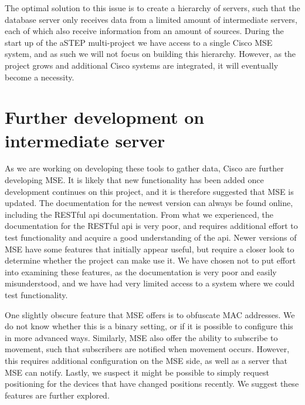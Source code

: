 The optimal solution to this issue is to create a hierarchy of servers, such that the database server only receives data from a limited amount of intermediate servers, each of which also receive information from an amount of sources. During the start up of the aSTEP multi-project we have access to a single Cisco MSE system, and as such we will not focus on building this hierarchy. However, as the project grows and additional Cisco systems are integrated, it will eventually become a necessity.

\section{Further development on intermediate server}\label{sec:future_intermediate}
As we are working on developing these tools to gather data, Cisco are further developing MSE. It is likely that new functionality has been added once development continues on this project, and it is therefore suggested that MSE is updated. The documentation for the newest version can always be found online, including the RESTful api documentation. From what we experienced, the documentation for the RESTful api is very poor, and requires additional effort to test functionality and acquire a good understanding of the api. Newer versions of MSE have some features that initially appear useful, but require a closer look to determine whether the project can make use it. We have chosen not to put effort into examining these features, as the documentation is very poor and easily misunderstood, and we have had very limited access to a system where we could test functionality.

One slightly obscure feature that MSE offers is to obfuscate MAC addresses. We do not know whether this is a binary setting, or if it is possible to configure this in more advanced ways. Similarly, MSE also offer the ability to subscribe to movement, such that subscribers are notified when movement occurs. However, this requires additional configuration on the MSE side, as well as a server that MSE can notify. Lastly, we suspect it might be possible to simply request positioning for the devices that have changed positions recently. We suggest these features are further explored.

 



